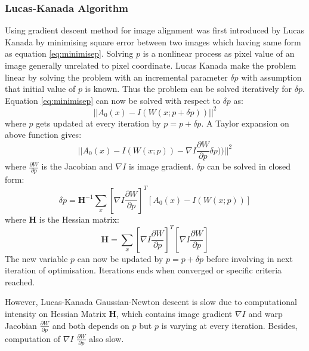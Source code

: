 \subsubsection{Lucas-Kanada Algorithm}
Using gradient descent method for image alignment was first introduced by Lucas Kanada by minimising square error between two images which having same form as equation \ref{eq:minimisep}. Solving $p$ is a nonlinear process as pixel value of an image generally unrelated to pixel coordinate. Lucas Kanada make the problem linear by solving the problem with an incremental parameter $\delta p$ with assumption that initial value of $p$ is known. Thus the problem can be solved iteratively for $\delta p$. Equation \ref{eq:minimisep} can now be solved with respect to $\delta p$ as:
\begin{equation}
\label{eq:minimisedp}
||A_0(x)-I(W(x;p+\delta p))||^2
\end{equation}
where $p$ gets updated at every iteration by $p=p+\delta p$. A Taylor expansion on above function gives:
\begin{equation}
\label{eq:minimisedptaylor}
||A_0(x)-I(W(x;p))-\nabla I\frac{\partial W}{\partial p} \delta p))||^2
\end{equation}
where $\frac{\partial W}{\partial p}$ is the Jacobian and $\nabla I$ is image gradient. $\delta p$ can be solved in closed form:
\begin{equation}
\label{eq:dp}
\delta p=\bm{H}^{-1}\sum_x[\nabla I\frac{\partial W}{\partial p}]^T[A_0(x)-I(W(x;p))]
\end{equation}
where $\bm{H}$ is the Hessian matrix:
\begin{equation}
\label{eq:hessian}
\bm{H}=\sum_x[\nabla I\frac{\partial W}{\partial p}]^T[\nabla I\frac{\partial W}{\partial p}]
\end{equation}
The new variable $p$ can now be updated by $p=p+\delta p$ before involving in next iteration of optimisation. Iterations ends when converged or specific criteria reached. 

However, Lucas-Kanada Gaussian-Newton descent is slow due to computational intensity on Hessian Matrix $\bm{H}$, which contains image gradient $\nabla I$ and warp Jacobian $\frac{\partial W}{\partial p}$ and both depends on $p$ but $p$ is varying at every iteration. Besides, computation of $\nabla I$ $\frac{\partial W}{\partial p}$ also slow.

